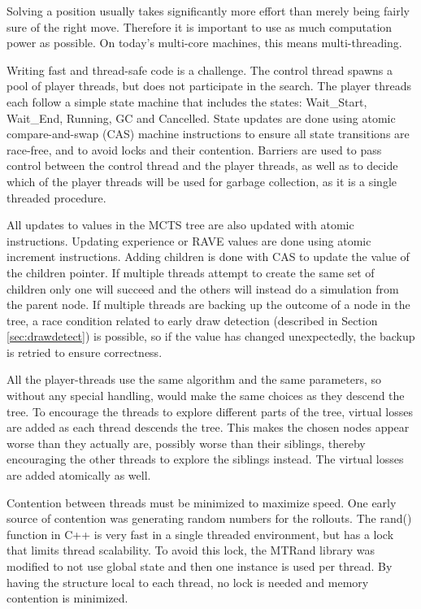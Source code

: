 Solving a position usually takes significantly more effort than merely being fairly sure of the right move. Therefore it is important to use as much computation power as possible. On today's multi-core machines, this means multi-threading.

Writing fast and thread-safe code is a challenge. The control thread spawns a pool of player threads, but does not participate in the search. The player threads each follow a simple state machine that includes the states: Wait\_Start, Wait\_End, Running, GC and Cancelled. State updates are done using atomic compare-and-swap (CAS) machine instructions to ensure all state transitions are race-free, and to avoid locks and their contention. Barriers are used to pass control between the control thread and the player threads, as well as to decide which of the player threads will be used for garbage collection, as it is a single threaded procedure.

All updates to values in the MCTS tree are also updated with atomic instructions. Updating experience or RAVE values are done using atomic increment instructions. Adding children is done with CAS to update the value of the children pointer. If multiple threads attempt to create the same set of children only one will succeed and the others will instead do a simulation from the parent node. If multiple threads are backing up the outcome of a node in the tree, a race condition related to early draw detection (described in Section \ref{sec:drawdetect}) is possible, so if the value has changed unexpectedly, the backup is retried to ensure correctness.

All the player-threads use the same algorithm and the same parameters, so without any special handling, would make the same choices as they descend the tree. To encourage the threads to explore different parts of the tree, virtual losses\cite{chaslot2008parallel} are added as each thread descends the tree. This makes the chosen nodes appear worse than they actually are, possibly worse than their siblings, thereby encouraging the other threads to explore the siblings instead. The virtual losses are added atomically as well.

Contention between threads must be minimized to maximize speed. One early source of contention was generating random numbers for the rollouts. The rand() function in C++ is very fast in a single threaded environment, but has a lock that limits thread scalability. To avoid this lock, the MTRand library was modified to not use global state and then one instance is used per thread. By having the structure local to each thread, no lock is needed and memory contention is minimized.

